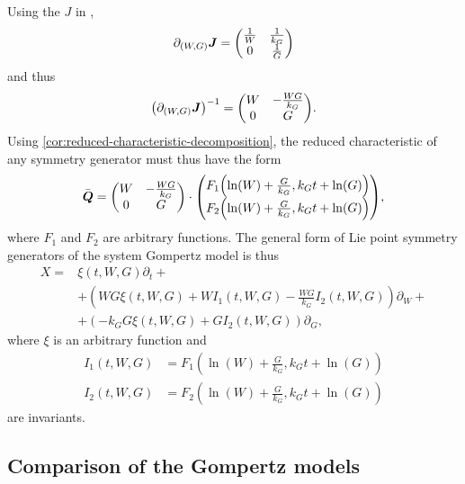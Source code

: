 Using the \(J\) in ,
\begin{equation*}
  \partial_{(W, G)} \boldsymbol{J} =
  \begin{pmatrix}
    \frac{1}{W} & \frac{1}{k_G} \\
    0 & \frac{1}{G}
  \end{pmatrix}
\end{equation*}
and thus
\begin{equation*}
  \left(\partial_{(W, G)} \vect{J}\right)^{-1} =
  \begin{pmatrix}
    W & - \frac{W G}{k_G} \\
    0 & G
  \end{pmatrix}.
\end{equation*}
Using \cref{cor:reduced-characteristic-decomposition}, the reduced characteristic of any symmetry generator must thus have the form
\begin{equation} \label{eq:general-system-gompertz-characteristic}
  \bar{\vect{Q}} =
  \begin{pmatrix}
    W & - \frac{W G}{k_G} \\
    0 & G
  \end{pmatrix}
  \cdot
  \begin{pmatrix}
    F_1\left(\ln\left(W\right) + \frac{G}{k_G}, k_G t + \ln\left(G\right)\right) \\
    F_2\left(\ln\left(W\right) + \frac{G}{k_G}, k_G t + \ln\left(G\right)\right)
  \end{pmatrix},
\end{equation}
where \(F_1\) and \(F_2\) are arbitrary functions.
The general form of Lie point symmetry generators of the system Gompertz model is thus
\begin{align*}
  X =& \xi(t, W, G) \partial_t + \\
  &+ \left(W G \xi(t, W, G) + W I_1(t, W, G) - \frac{W G}{k_G} I_2(t, W, G)\right) \partial_W + \\
  &+ \left(-k_G G \xi(t, W, G) + G I_2(t, W, G)\right) \partial_G,
\end{align*}
where \(\xi\) is an arbitrary function and
\begin{align*}
  I_1(t, W, G) &= F_1\left(\ln\left(W\right) + \frac{G}{k_G}, k_G t + \ln\left(G\right)\right) \\
  I_2(t, W, G) &= F_2\left(\ln\left(W\right) + \frac{G}{k_G}, k_G t + \ln\left(G\right)\right)
\end{align*}
are invariants.

\subsection{Comparison of the Gompertz models}

